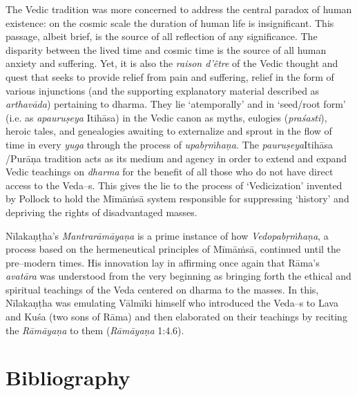 The Vedic tradition was more concerned to address the central paradox of human existence: on the cosmic scale the duration of human life is insignificant. This passage, albeit brief, is the source of all reflection of any significance. The disparity between the lived time and cosmic time is the source of all human anxiety and suffering. Yet, it is also the \textit{raison d'être} of the Vedic thought and quest that seeks to provide relief from pain and suffering, relief in the form of various injunctions (and the supporting explanatory material described as \textit{arthavāda}) pertaining to dharma. They lie ‘atemporally’ and in ‘seed/root form’ (i.e. as \textit{apauruṣeya }Itihāsa) in the Vedic canon as myths, eulogies (\textit{praśasti}), heroic tales, and genealogies awaiting to externalize and sprout in the flow of time in every \textit{yuga} through the process of \textit{upabṛṁhaṇa.} The \textit{pauruṣeya}Itihāsa /Purāṇa tradition acts as its medium and agency in order to extend and expand Vedic teachings on \textit{dharma} for the benefit of all those who do not have direct access to the Veda–s. This gives the lie to the process of ‘Vedicization’ invented by Pollock to hold the Mīmāṁsā system responsible for suppressing ‘history’ and depriving the rights of disadvantaged masses.

Nīlakaṇṭha's \textit{Mantrarāmāyaṇa} is a prime instance of how \textit{Vedopabṛṁ\-haṇa}, a process based on the hermeneutical principles of Mīmāṁsā, continued until the pre–modern times. His innovation lay in affirming once again that Rāma's \textit{avatāra} was understood from the very beginning as bringing forth the ethical and spiritual teachings of the Veda centered on dharma to the masses. In this, Nīlakaṇṭha was emulating Vālmīki himself who introduced the Veda–s to Lava and Kuśa (two sons of Rāma) and then elaborated on their teachings by reciting the \textit{Rāmāyaṇa} to them (\textit{Rāmāyaṇa} 1:4.6).


\section*{Bibliography}

